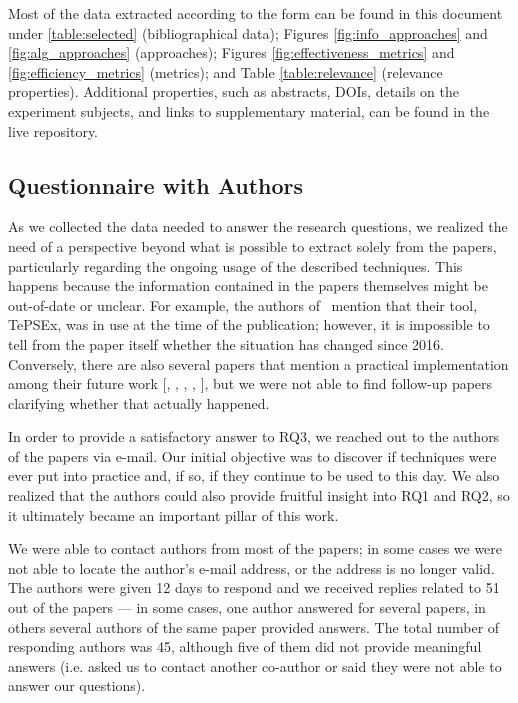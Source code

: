 Most of the data extracted according to the form can be found in this document under \autoref{table:selected} (bibliographical data); Figures \ref{fig:info_approaches} and \ref{fig:alg_approaches} (approaches); Figures \ref{fig:effectiveness_metrics} and \ref{fig:efficiency_metrics} (metrics); and Table \ref{table:relevance} (\rea relevance properties).
Additional properties, such as abstracts, DOIs, details on the experiment subjects, and links to supplementary material, can be found in the live repository.



\subsection{Questionnaire with Authors}
\label{subsec:questionnaires}

As we collected the data needed to answer the research questions, we realized the need of a perspective beyond what is possible to extract solely from the papers, particularly regarding the ongoing usage of the described techniques.
This happens because the information contained in the papers themselves might be out-of-date or unclear.
For example, the authors of~ mention that their tool, TePSEx, was in use at the time of the publication; however, it is impossible to tell from the paper itself whether the situation has changed since 2016.
Conversely, there are also several papers that mention a practical implementation among their future work [, 
, 
, 
, 
], but we were not able to find follow-up papers clarifying whether that actually happened.

In order to provide a satisfactory answer to RQ3, we reached out to the authors of the papers via e-mail.
Our initial objective was to discover if techniques were ever put into practice and, if so, if they continue to be used to this day.
We also realized that the authors could also provide fruitful insight into RQ1 and RQ2, so it ultimately became an important pillar of this work.

We were able to contact authors from most of the papers; in some cases we were not able to locate the author's e-mail address, or the address is no longer valid.
The authors were given 12 days to respond and we received replies related to 51 out of the \numpapers papers --- in some cases, one author answered for several papers, in others several authors of the same paper provided answers.
The total number of responding authors was 45, although five of them did not provide meaningful answers (i.e. asked us to contact another co-author or said they were not able to answer our questions).

